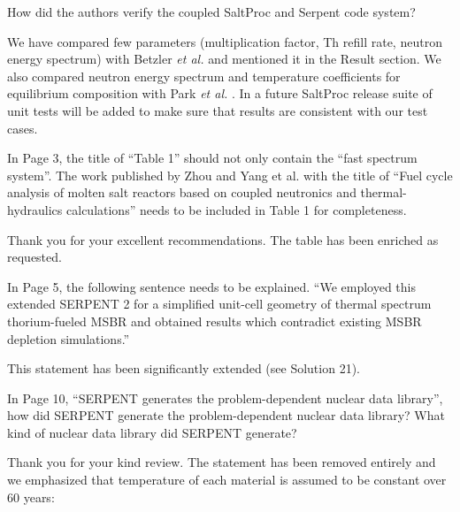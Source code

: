 \documentclass[answers,11pt]{exam}
\begin{document}
\begin{questions}
        \question  How did the authors verify the coupled SaltProc and Serpent 
        code system?  
        \begin{solution}
                We have compared few parameters (multiplication factor, Th refill 
                rate, neutron energy spectrum) with Betzler \emph{et al.} 											\cite{betzler_molten_2017} and mentioned it in the Result section. 
                We also compared neutron energy spectrum and temperature coefficients
                 for equilibrium composition with Park \emph{et al.} \cite{park_whole_2015}.
                In a future SaltProc release suite of unit tests will be added 
                to make sure that results are consistent with our test cases.
        \end{solution}

        \question  In Page 3, the title of ``Table 1'' should not only contain 
        the ``fast spectrum system''. The work published by Zhou and Yang et al. 
        with the title of ``Fuel cycle analysis of molten salt reactors based on 
        coupled neutronics and thermal-hydraulics calculations'' needs to be 
        included in Table 1 for completeness.
        \begin{solution}
                Thank you for your excellent recommendations. The table has been 
                enriched as requested.
        \end{solution}

        \question  In Page 5, the following sentence needs to be explained. ``We 
        employed this extended SERPENT 2 for a simplified unit-cell geometry of 
        thermal spectrum thorium-fueled MSBR and obtained results which 
        contradict existing MSBR depletion simulations.''
        \begin{solution}
                This statement has been significantly extended (see Solution 21).
        \end{solution}

        \question  In Page 10, ``SERPENT generates the problem-dependent nuclear 
        data library'', how did SERPENT generate the problem-dependent nuclear 
        data library? What kind of nuclear data library did SERPENT generate?
        \begin{solution}
                Thank you for your kind review. The statement has been removed
		        entirely and we emphasized that temperature of each material is 
		        assumed to be constant over 60 years:
		        

\end{solution}
\end{questions}
\end{document}
